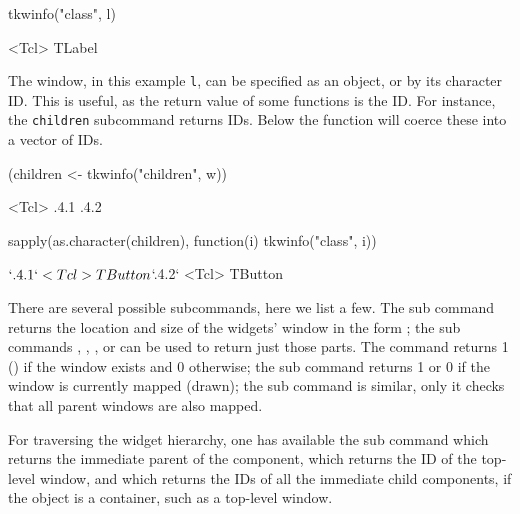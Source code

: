 \begin{Schunk}
\begin{Sinput}
 tkwinfo("class", l)
\end{Sinput}
\begin{Soutput}
<Tcl> TLabel 
\end{Soutput}
\end{Schunk}
%

The window, in this example \texttt{l}, can be specified as an \R\/
object, or by its character ID. This is useful, as the return value of
some functions is the ID. For instance, the \texttt{children}
subcommand returns IDs. Below the  function will
coerce these into a vector of IDs.


\begin{Schunk}
\begin{Sinput}
 (children <- tkwinfo("children", w))
\end{Sinput}
\begin{Soutput}
<Tcl> .4.1 .4.2 
\end{Soutput}
\begin{Sinput}
 sapply(as.character(children), function(i) tkwinfo("class", i))
\end{Sinput}
\begin{Soutput}
$`.4.1`
<Tcl> TButton 

$`.4.2`
<Tcl> TButton 
\end{Soutput}
\end{Schunk}

There are several possible subcommands, here we list a few. The
 sub command returns the location and
size of the widgets' window in the form ;
the sub commands ,
, , or
 can be used to return just those parts. The
 command returns 1 () if the
window exists and 0 otherwise; the  sub
command returns 1 or 0 if the window is currently mapped (drawn); the
 sub command is similar, only it checks
that all parent windows are also mapped.  

For traversing the widget hierarchy, one has available the
 sub command which returns the immediate
parent of the component,  which returns
the ID of the top-level window, and 
which returns the IDs of all the immediate child components, if the
object is a container, such as a top-level window.


